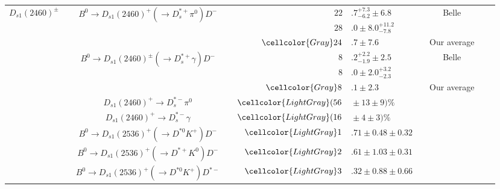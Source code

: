 {\begin{tabular}{cp{5pt}cp{5pt}r@{}lp{5pt}cp{5pt}c}
	\multirow{9}{*}[-5pt]{$D_{s1}(2460)^{\pm}$}	&&	\multirow{3}{*}{$B^{0}\to D_{s1}(2460)^{+}(\to D^{*+}_{s}\pi^{0})D^{-}$}	&&$	22$&$.7^{+7.3}_{-6.2}\pm6.8	$&&	Belle	&&	\cite{Krokovny:2003zq}        \\
		&&		&&$	28$&$.0\pm 8.0{}^{+11.2}_{-7.8}	$&&	\babar{}	&&	\cite{Aubert:2004pw}          \\  \cmidrule{4-9}
		&&		&\cellcolor{Gray}&$	\cellcolor{Gray}24$&\cellcolor{Gray}$.7 \pm 7.6	$&\cellcolor{Gray}&	\cellcolor{Gray}  Our average	&\cellcolor{Gray}&	\\ \cmidrule{3-9}
		&&	\multirow{3}{*}{$B^{0}\to D_{s1}(2460)^{\pm}(\to D^{*+}_{s}\gamma)D^{-}$}	&&$	8$&$.2^{+2.2}_{-1.9}\pm2.5	$&&	Belle	&&	\cite{Krokovny:2003zq}        \\
		&&		&&$	8$&$.0\pm 2.0{}^{+3.2}_{-2.3}	$&&	\babar{}	&&	\cite{Aubert:2004pw}          \\  \cmidrule{4-9}
		&&		&\cellcolor{Gray}&$	\cellcolor{Gray}8$&\cellcolor{Gray}$.1 \pm 2.3	$&\cellcolor{Gray}&	\cellcolor{Gray}  Our average	&\cellcolor{Gray}&	\\ \cmidrule{3-9}
		&&	$D_{s1}(2460)^{+}\to D^{*-}_{s}\pi^{0}$	&\cellcolor{LightGray} &$	\cellcolor{LightGray} (56$&\cellcolor{LightGray}${}\pm13\pm9)\%	$&\cellcolor{LightGray}&	\cellcolor{LightGray} \babar{}	&\cellcolor{LightGray}&	\cite{Aubert:2006nm}          \\ \cmidrule{3-9}
		&&	$D_{s1}(2460)^{+}\to D^{*-}_{s}\gamma$	&\cellcolor{LightGray} &$	\cellcolor{LightGray} (16$&\cellcolor{LightGray}${}\pm4\pm3)\%	$&\cellcolor{LightGray}&	\cellcolor{LightGray} \babar{}	&\cellcolor{LightGray}&	\cite{Aubert:2006nm}          \\ \midrule
		&&	\multirow{1}{*}{$B^{0}\to D_{s1}(2536)^{+}(\to D^{*0}K^{+})D^{-}$}	&\cellcolor{LightGray} &$	\cellcolor{LightGray} 1$&\cellcolor{LightGray}$.71\pm0.48\pm0.32	$&\cellcolor{LightGray}&	\cellcolor{LightGray} \babar{}	&\cellcolor{LightGray}&	\cite{Aubert:2007rva}         \\ \cmidrule{3-9}
		&&	\multirow{1}{*}{$B^{0}\to D_{s1}(2536)^{+}(\to D^{*+}K^{0})D^{-}$}	&\cellcolor{LightGray} &$	\cellcolor{LightGray} 2$&\cellcolor{LightGray}$.61\pm1.03\pm0.31	$&\cellcolor{LightGray}&	\cellcolor{LightGray} \babar{}	&\cellcolor{LightGray}&	\cite{Aubert:2007rva}         \\ \cmidrule{3-9}
		&&	\multirow{1}{*}{$B^{0}\to D_{s1}(2536)^{+}(\to D^{*0}K^{+})D^{*-}$}	&\cellcolor{LightGray} &$	\cellcolor{LightGray} 3$&\cellcolor{LightGray}$.32\pm0.88\pm0.66	$&\cellcolor{LightGray}&	\cellcolor{LightGray} \babar{}	&\cellcolor{LightGray}&	\cite{Aubert:2007rva}         \\ \cmidrule{3-9}

\end{tabular}}
